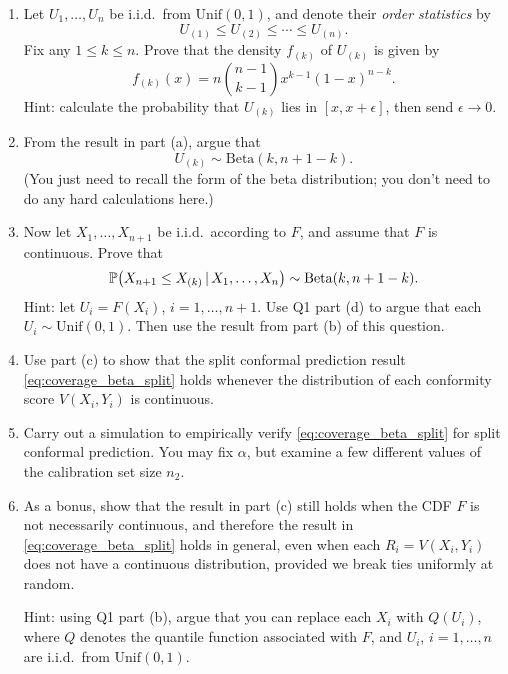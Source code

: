 \documentclass{article}
\begin{document}
\begin{enumerate}[label=(\alph*)]
\item Let $U_1,\dots,U_n$ be i.i.d.\ from $\mathrm{Unif}(0,1)$, and denote their
  \emph{order statistics} by  
  \[
  U_{(1)} \leq U_{(2)} \leq \cdots \leq U_{(n)}.
  \]
  Fix any $1 \leq k \leq n$. Prove that the density $f_{(k)}$ of $U_{(k)}$ is
  given by 
  \marginpar{\small [8 pts]}
  \[
  f_{(k)}(x) = n {n-1 \choose k-1} x^{k-1} (1-x)^{n-k}.
  \]
  Hint: calculate the probability that $U_{(k)}$ lies in $[x,x+\epsilon]$, then
  send $\epsilon \to 0$.
  
\item From the result in part (a), argue that 
  \marginpar{\small [2 pts]}
  \[
  U_{(k)} \sim \mathrm{Beta}(k, n+1-k).
  \]
  (You just need to recall the form of the beta distribution; you don't need to
  do any hard calculations here.)

\item Now let $X_1,\dots,X_{n+1}$ be i.i.d.\ according to $F$, and assume that
  $F$ is continuous. Prove that 
  \marginpar{\small [6 pts]}
  \[
  \P\big( X_{n+1} \leq X_{(k)} \,|\, X_1,\dots,X_n \big) \sim \mathrm{Beta}(k,
  n+1-k). 
  \]
  Hint: let $U_i = F(X_i)$, $i=1,\dots,n+1$. Use Q1 part (d) to argue that each
  $U_i \sim \mathrm{Unif}(0,1)$. Then use the result from part (b) of this
  question.  

\item Use part (c) to show that the split conformal prediction result
  \eqref{eq:coverage_beta_split} holds whenever the distribution of each
  conformity score $V(X_i,Y_i)$ is continuous.  
  \marginpar{\small [4 pts]}

\item Carry out a simulation to empirically verify
  \eqref{eq:coverage_beta_split} for split conformal prediction. You may fix
  $\alpha$, but examine a few different values of the calibration set size
  $n_2$.   
  \marginpar{\small [10 pts]}

\item As a bonus, show that the result in part (c) still holds when the CDF $F$
  is not necessarily continuous, and therefore the result in 
  \eqref{eq:coverage_beta_split} holds in general, even when each $R_i =
  V(X_i,Y_i)$ does not have a continuous distribution, provided we break ties
  uniformly at random. 

  Hint: using Q1 part (b), argue that you can replace each $X_i$ with $Q(U_i)$,
  where $Q$ denotes the quantile function associated with $F$, and $U_i$, 
  $i=1,\dots,n$ are i.i.d.\ from $\mathrm{Unif}(0,1)$.
\end{enumerate}
\end{document}
